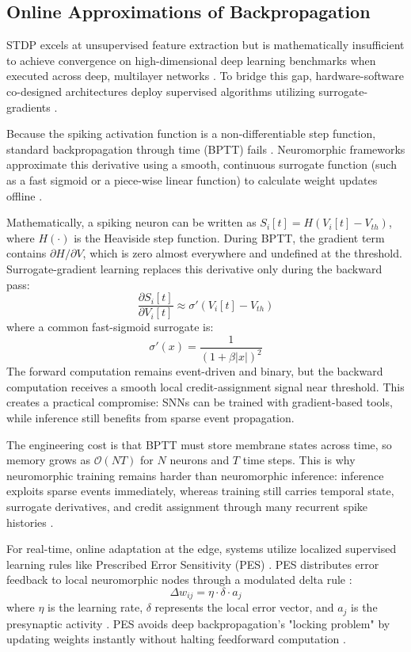 \documentclass[11pt]{article}
\begin{document}
\subsection{Online Approximations of Backpropagation}
STDP excels at unsupervised feature extraction but is mathematically insufficient to achieve convergence on high-dimensional deep learning benchmarks when executed across deep, multilayer networks \cite{schuman2017survey,mead1990neuromorphic}. To bridge this gap, hardware-software co-designed architectures deploy supervised algorithms utilizing surrogate-gradients \cite{schuman2017survey,mead1990neuromorphic}.

Because the spiking activation function is a non-differentiable step function, standard backpropagation through time (BPTT) fails \cite{schuman2017survey}. Neuromorphic frameworks approximate this derivative using a smooth, continuous surrogate function (such as a fast sigmoid or a piece-wise linear function) to calculate weight updates offline \cite{schuman2017survey,mead1990neuromorphic}. 

Mathematically, a spiking neuron can be written as $S_i[t]=H(V_i[t]-V_{th})$, where $H(\cdot)$ is the Heaviside step function. During BPTT, the gradient term contains $\partial H/\partial V$, which is zero almost everywhere and undefined at the threshold. Surrogate-gradient learning replaces this derivative only during the backward pass:
$$\frac{\partial S_i[t]}{\partial V_i[t]} \approx \sigma'(V_i[t]-V_{th})$$
where a common fast-sigmoid surrogate is:
$$\sigma'(x)=\frac{1}{\left(1+\beta |x|\right)^2}$$
The forward computation remains event-driven and binary, but the backward computation receives a smooth local credit-assignment signal near threshold. This creates a practical compromise: SNNs can be trained with gradient-based tools, while inference still benefits from sparse event propagation.

The engineering cost is that BPTT must store membrane states across time, so memory grows as $\mathcal{O}(NT)$ for $N$ neurons and $T$ time steps. This is why neuromorphic training remains harder than neuromorphic inference: inference exploits sparse events immediately, whereas training still carries temporal state, surrogate derivatives, and credit assignment through many recurrent spike histories \cite{shrestha2018slayer}.

For real-time, online adaptation at the edge, systems utilize localized supervised learning rules like Prescribed Error Sensitivity (PES) \cite{schuman2017survey}. PES distributes error feedback to local neuromorphic nodes through a modulated delta rule \cite{schuman2017survey}:
$$\Delta w_{ij} = \eta \cdot \delta \cdot a_j$$
where $\eta$ is the learning rate, $\delta$ represents the local error vector, and $a_j$ is the presynaptic activity \cite{schuman2017survey}. PES avoids deep backpropagation's "locking problem" by updating weights instantly without halting feedforward computation \cite{schuman2017survey}.
\end{document}
